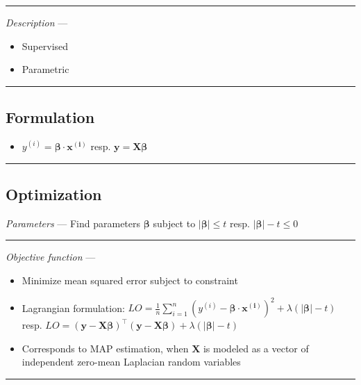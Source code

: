 {\color{lightgray}\hrule height 0.001mm}

\emph{Description} --- 
\begin{itemize}
    \item Supervised 
    \item Parametric
\end{itemize}

{\color{black}\hrule height 0.001mm}

\subsection*{Formulation}

\begin{itemize}
    \item $y^{(i)} = \boldsymbol{\beta} \cdot \boldsymbol{x^{(i)}}$ resp. $\boldsymbol{y} = \boldsymbol{X}\boldsymbol{\beta}$
\end{itemize}

{\color{black}\hrule height 0.001mm}

\subsection*{Optimization}
\emph{Parameters} --- Find parameters $\boldsymbol{\beta}$ subject to $|\boldsymbol{\beta}| \leq t$ resp. $|\boldsymbol{\beta}| - t \leq 0$

{\color{lightgray}\hrule height 0.001mm}

\emph{Objective function} --- 
\begin{itemize}
    \item Minimize mean squared error subject to constraint
    \item Lagrangian formulation: $LO = \frac{1}{n} \sum_{i=1}^n ( y^{(i)} - \boldsymbol{\beta} \cdot \boldsymbol{x^{(i)}} )^2 + \lambda ( |\boldsymbol{\beta}| - t )$ resp. $LO = ( \boldsymbol{y} - \boldsymbol{X}\boldsymbol{\beta})^\intercal( \boldsymbol{y} - \boldsymbol{X}\boldsymbol{\beta} ) + \lambda ( |\boldsymbol{\beta}| - t )$
    \item Corresponds to MAP estimation, when $\boldsymbol{X}$ is modeled as a vector of independent zero-mean Laplacian random variables
\end{itemize}

{\color{lightgray}\hrule height 0.001mm}

